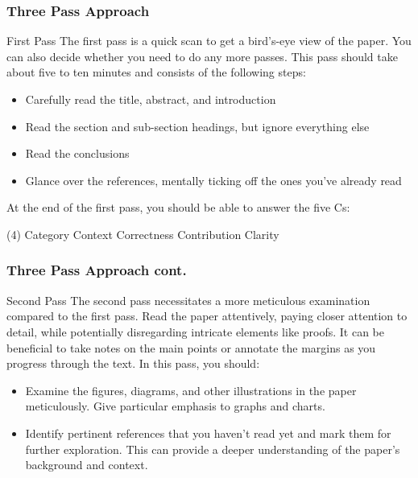\documentclass[11pt,xcolor={dvipsnames},hyperref={pdftex,pdfpagemode=UseNone,hidelinks,pdfdisplaydoctitle=true},usepdftitle=false]{beamer}
\begin{document}
\begin{frame}
	\frametitle{Three Pass Approach}
	\begin{block}{First Pass}
		The first pass is a quick scan to get a bird’s-eye view of the paper. You can also decide whether you need to do any more passes. This pass should take about five to ten minutes and consists of the following steps:
		\begin{itemize}
			\item Carefully read the title, abstract, and introduction
			\item Read the section and sub-section headings, but ignore
			everything else
			\item Read the conclusions
			\item Glance over the references, mentally ticking off the
			ones you’ve already read
		\end{itemize}
		At the end of the first pass, you should be able to answer
		the five Cs:
		\begin{tasks}[style=enumerate, item-format={\normalfont}, after-item-skip=4mm](4)
			\task Category 
			\task Context
			\task Correctness
			\task Contribution
			\task Clarity
		\end{tasks}
	\end{block}
	
\end{frame}

\begin{frame}
	\frametitle{Three Pass Approach cont.}
	
	\begin{block}{Second Pass}
		The second pass necessitates a more meticulous examination compared to the first pass. Read the paper attentively, paying closer attention to detail, while potentially disregarding intricate elements like proofs. It can be beneficial to take notes on the main points or annotate the margins as you progress through the text. In this pass, you should:
		\begin{itemize}
			\item Examine the figures, diagrams, and other illustrations in the paper meticulously. Give particular emphasis to graphs and charts.
			\item Identify pertinent references that you haven't read yet and mark them for further exploration. This can provide a deeper understanding of the paper's background and context.
		\end{itemize}
		
	\end{block}
\end{frame}
\end{document}
